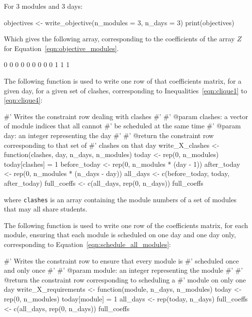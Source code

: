 For 3 modules and 3 days:

\begin{Rin-no-test}
objectives <- write_objective(n_modules = 3, n_days = 3)
print(objectives)
\end{Rin-no-test}

Which gives the following array, corresponding to the coefficients of the
array \(Z\) for Equation~\ref{eqn:objective_modules}.

\begin{Rout-no-test}
[1] 0 0 0 0 0 0 0 0 0 1 1 1
\end{Rout-no-test}

The following function is used to write one row of that coefficients matrix, for
a given day, for a given set of clashes, corresponding to
Inequalities~\ref{eqn:clique1} to \ref{eqn:clique4}:

\begin{Rin-no-test}
#' Writes the constraint row dealing with clashes
#'
#' @param clashes: a vector of module indices that all cannot
#'                 be scheduled at the same time
#' @param day: an integer representing the day
#'
#' @return the constraint row corresponding to that set of
#'         clashes on that day
write_X_clashes <- function(clashes, day, n_days, n_modules){
  today <- rep(0, n_modules)
  today[clashes] = 1
  before_today <- rep(0, n_modules * (day - 1))
  after_today <- rep(0, n_modules * (n_days - day))
  all_days <- c(before_today, today, after_today)
  full_coeffs <- c(all_days, rep(0, n_days))
  full_coeffs
}
\end{Rin-no-test}

where \texttt{clashes} is an array containing the module numbers of a set
of modules that may all share students.

The following function is used to write one row of the coefficients matrix, for
each module, ensuring that each module is scheduled on one day and one day only,
corresponding to Equation~\ref{eqn:schedule_all_modules}:

\begin{Rin-no-test}
#' Writes the constraint row to ensure that every module is
#' scheduled once and only once
#'
#' @param module: an integer representing the module
#'
#' @return the constraint row corresponding to scheduling a
#'         module on only one day
write_X_requirements <- function(module, n_days, n_modules){
  today <- rep(0, n_modules)
  today[module] = 1
  all_days <- rep(today, n_days)
  full_coeffs <- c(all_days, rep(0, n_days))
  full_coeffs
}
\end{Rin-no-test}

